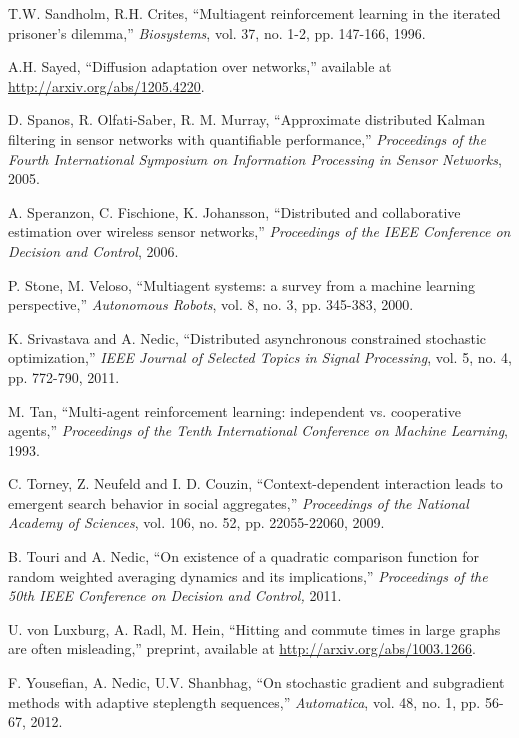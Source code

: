 \documentclass[final]{siamltex}
\begin{document}
\begin{thebibliography}{99}
 T.W. Sandholm, R.H. Crites, ``Multiagent reinforcement learning in the iterated prisoner's dilemma,''
{\em Biosystems}, vol. 37, no. 1-2, pp. 147-166, 1996.

 A.H.  Sayed, ``Diffusion adaptation over networks,'' available at 
\url{http://arxiv.org/abs/1205.4220}.

 D. Spanos, R. Olfati-Saber, R. M. Murray, ``Approximate distributed Kalman filtering in sensor
networks with quantifiable performance,'' {\em Proceedings of the Fourth International Symposium on Information
Processing in Sensor Networks}, 2005. 

  A. Speranzon, C. Fischione, K. Johansson, ``Distributed and collaborative estimation over wireless sensor networks,''
{\em Proceedings of the IEEE Conference on Decision and Control}, 2006. 

 P. Stone, M. Veloso, ``Multiagent systems: a survey from a machine learning perspective,'' 
{\em Autonomous Robots}, vol. 8, no. 3, pp. 345-383, 2000.

 K. Srivastava and A. Nedic, ``Distributed asynchronous constrained stochastic optimization,''
{\em IEEE Journal of Selected Topics in Signal Processing}, vol. 5, no. 4, pp. 772-790, 2011.

 M. Tan, ``Multi-agent reinforcement learning: independent vs. cooperative agents,'' {\em 
Proceedings of the Tenth International Conference on Machine Learning}, 1993.

 C. Torney, Z. Neufeld and I. D. Couzin, ``Context-dependent interaction leads to emergent search behavior in social aggregates,'' {\em Proceedings of the National Academy of Sciences}, vol. 106, no. 52, pp. 22055-22060, 2009.

 B. Touri and A. Nedic, ``On existence of a quadratic comparison function for random weighted averaging dynamics and its implications,''
{\em Proceedings of the 50th IEEE Conference on Decision and Control,}  2011.

 U. von Luxburg, A. Radl, M. Hein, ``Hitting and commute times in large graphs are often misleading,'' preprint, 
available at \url{http://arxiv.org/abs/1003.1266}.

 F. Yousefian, A. Nedic, U.V. Shanbhag, ``On stochastic gradient and subgradient methods with
adaptive steplength sequences,'' {\em Automatica}, vol. 48, no. 1, pp. 56-67, 2012.

\end{thebibliography}
\end{document}
